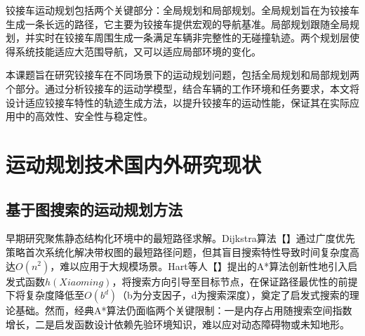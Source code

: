 \documentclass[master,academic]{ysuthesis} %
\begin{document}
	铰接车运动规划包括两个关键部分：全局规划和局部规划。全局规划旨在为铰接车生成一条长远的路径，它主要为铰接车提供宏观的导航基准。局部规划跟随全局规划，并实时在铰接车周围生成一条满足车辆非完整性的无碰撞轨迹。两个规划层使得系统技能适应大范围导航，又可以适应局部环境的变化。

	本课题旨在研究铰接车在不同场景下的运动规划问题，包括全局规划和局部规划两个部分。通过分析铰接车的运动学模型，结合车辆的工作环境和任务要求，本文将设计适应铰接车特性的轨迹生成方法，以提升铰接车的运动性能，保证其在实际应用中的高效性、安全性与稳定性。
	\section{运动规划技术国内外研究现状}
		\subsection{基于图搜索的运动规划方法}
		早期研究聚焦静态结构化环境中的最短路径求解。Dijkstra算法【】通过广度优先策略首次系统化解决带权图的最短路径问题，但其盲目搜索特性导致时间复杂度高达$O(n^2)$，难以应用于大规模场景。Hart等人【】提出的A*算法创新性地引入启发式函数$h(Xiaoming)$，将搜索方向引导至目标节点，在保证路径最优性的前提下将复杂度降低至$O(b^d)$（b为分支因子，d为搜索深度），奠定了启发式搜索的理论基础。然而，经典A*算法仍面临两个关键限制：一是内存占用随搜索空间指数增长，二是启发函数设计依赖先验环境知识，难以应对动态障碍物或未知地形。
\end{document}
